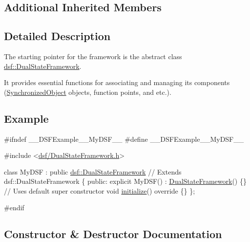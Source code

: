 \subsection*{Additional Inherited Members}


\subsection{Detailed Description}
The starting pointer for the framework is the abstract class \hyperlink{classdsf_1_1_dual_state_framework}{dsf\+::\+Dual\+State\+Framework}. 

It provides essential functions for associating and managing its components (\hyperlink{classdsf_1_1_synchronized_object}{Synchronized\+Object} objects, function points, and etc.). \hypertarget{classdsf_1_1_synchronized_object_eg}{}\subsection{Example}\label{classdsf_1_1_synchronized_object_eg}

\begin{DoxyCodeInclude}
\textcolor{preprocessor}{#ifndef \_\_DSFExample\_\_MyDSF\_\_}
\textcolor{preprocessor}{#define \_\_DSFExample\_\_MyDSF\_\_}

\textcolor{preprocessor}{#include <\hyperlink{_dual_state_framework_8h}{dsf/DualStateFramework.h}>}

\textcolor{keyword}{class }MyDSF : \textcolor{keyword}{public} \hyperlink{classdsf_1_1_dual_state_framework}{dsf::DualStateFramework} \textcolor{comment}{// Extends dsf::DualStateFramework}
\{
\textcolor{keyword}{public}:
    \textcolor{keyword}{explicit} MyDSF() : \hyperlink{classdsf_1_1_dual_state_framework_ab2c3f064dee1876d92694544d032b942}{DualStateFramework}() \{\} \textcolor{comment}{// Uses default super constructor}
    \textcolor{keywordtype}{void} \hyperlink{classdsf_1_1_dual_state_framework_a809a7bba4148e17ea9a43a0a035383ba}{initialize}()\textcolor{keyword}{ override }\{\}
\};

\textcolor{preprocessor}{#endif}
\end{DoxyCodeInclude}
 

\subsection{Constructor \& Destructor Documentation}
\hypertarget{classdsf_1_1_dual_state_framework_ab2c3f064dee1876d92694544d032b942}{}

